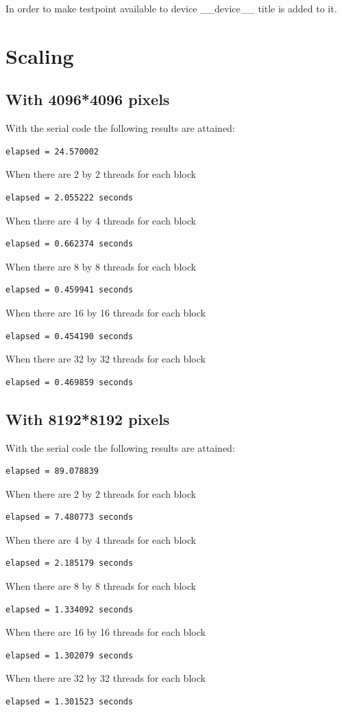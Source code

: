 \documentclass{article}
\begin{document}
In order to make testpoint available to device \_\_device\_\_ title is added to it.
\section{Scaling}
\subsection{With 4096*4096 pixels}
With the serial code the following results are attained:
\begin{verbatim}
elapsed = 24.570002
\end{verbatim}
When there are 2 by 2 threads for each block
\begin{verbatim}
elapsed = 2.055222 seconds
\end{verbatim}
When there are 4 by 4 threads for each block
\begin{verbatim}
elapsed = 0.662374 seconds
\end{verbatim}
When there are 8 by 8 threads for each block
\begin{verbatim}
elapsed = 0.459941 seconds
\end{verbatim}
When there are 16 by 16 threads for each block
\begin{verbatim}
elapsed = 0.454190 seconds
\end{verbatim}
When there are 32 by 32 threads for each block
\begin{verbatim}
elapsed = 0.469859 seconds
\end{verbatim}

\subsection{With 8192*8192 pixels}
With the serial code the following results are attained:
\begin{verbatim}
elapsed = 89.078839
\end{verbatim}
When there are 2 by 2 threads for each block
\begin{verbatim}
elapsed = 7.480773 seconds
\end{verbatim}
When there are 4 by 4 threads for each block
\begin{verbatim}
elapsed = 2.185179 seconds
\end{verbatim}
When there are 8 by 8 threads for each block
\begin{verbatim}
elapsed = 1.334092 seconds
\end{verbatim}
When there are 16 by 16 threads for each block
\begin{verbatim}
elapsed = 1.302079 seconds
\end{verbatim}
When there are 32 by 32 threads for each block
\begin{verbatim}
elapsed = 1.301523 seconds
\end{verbatim}
\end{document}
